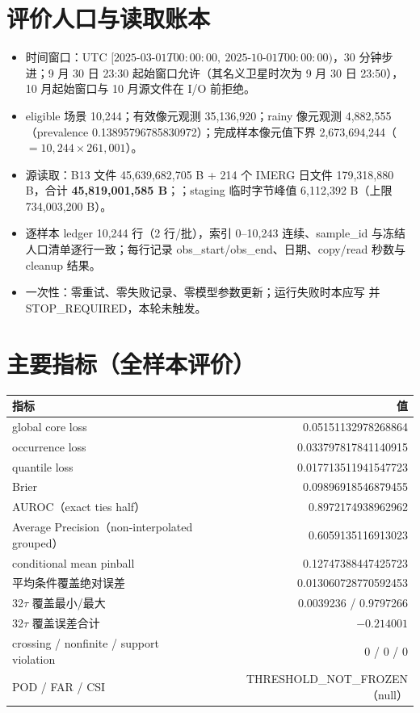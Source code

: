 \documentclass[UTF8,11pt,a4paper,fontset=windows]{ctexart}
\begin{document}
\section{评价人口与读取账本}
\begin{itemize}
\item 时间窗口：UTC $[2025\text{-}03\text{-}01T00:00:00,\ 2025\text{-}10\text{-}01T00:00:00)$，30 分钟步进；9 月 30 日 23:30 起始窗口允许（其名义卫星时次为 9 月 30 日 23:50），10 月起始窗口与 10 月源文件在 I/O 前拒绝。
\item eligible 场景 10,244；有效像元观测 35,136,920；rainy 像元观测 4,882,555（prevalence 0.13895796785830972）；完成样本像元值下界 2,673,694,244（$=10{,}244\times261{,}001$）。
\item 源读取：B13 文件 45,639,682,705 B + 214 个 IMERG 日文件 179,318,880 B，合计 \textbf{45,819,001,585 B}；；staging 临时字节峰值 6,112,392 B（上限 734,003,200 B）。
\item 逐样本 ledger 10,244 行（2 行/批），索引 0--10,243 连续、sample\_id 与冻结人口清单逐行一致；每行记录 obs\_start/obs\_end、日期、copy/read 秒数与 cleanup 结果。
\item 一次性：零重试、零失败记录、零模型参数更新；运行失败时本应写  并 STOP\_REQUIRED，本轮未触发。
\end{itemize}

\section{主要指标（全样本评价）}
{\small\begin{longtable}{p{80mm}r}
\textbf{指标} & \textbf{值}\\\hline
global core loss & 0.05151132978268864\\
occurrence loss & 0.033797817841140915\\
quantile loss & 0.017713511941547723\\
Brier & 0.09896918546879455\\
AUROC（exact ties half） & 0.8972174938962962\\
Average Precision（non-interpolated grouped） & 0.6059135116913023\\
conditional mean pinball & 0.12747388447425723\\
平均条件覆盖绝对误差 & 0.013060728770592453\\
32$\tau$ 覆盖最小/最大 & 0.0039236 / 0.9797266\\
32$\tau$ 覆盖误差合计 & $-0.214001$\\
crossing / nonfinite / support violation & 0 / 0 / 0\\
POD / FAR / CSI & THRESHOLD\_NOT\_FROZEN（null）\\\hline
\end{longtable}}
\end{document}
